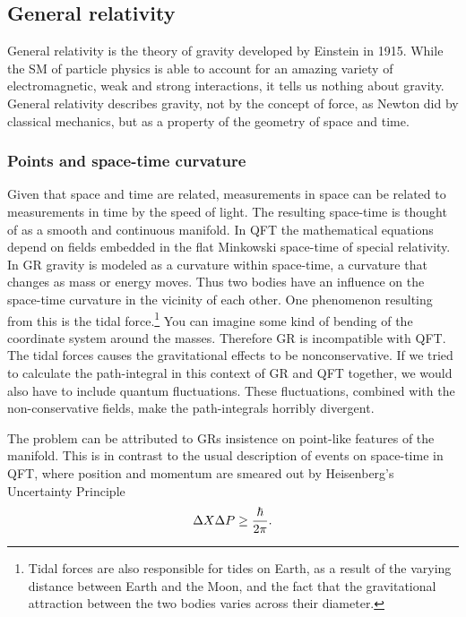 \subsection{General relativity}
General relativity is the theory of gravity developed by Einstein in 1915. While the SM of particle physics is able to account for an amazing variety of electromagnetic, weak and strong interactions, it tells us nothing about gravity. General relativity describes gravity, not by the concept of force, as Newton did by classical mechanics, but as a property of the geometry of space and time.

\subsubsection{Points and space-time curvature}
Given that space and time are related, measurements in space can be related to measurements in time by the speed of light. The resulting space-time is thought of as a smooth and continuous manifold. In QFT the mathematical equations depend on fields embedded in the flat Minkowski space-time of special relativity. In GR gravity is modeled as a curvature within space-time, a curvature that changes as mass or energy moves. Thus two bodies have an influence on the space-time curvature in the vicinity of each other. One phenomenon resulting from this is the tidal force.\footnote{Tidal forces are also responsible for tides on Earth, as a result of the varying distance between Earth and the Moon, and the fact that the gravitational attraction between the two bodies varies across their diameter.} You can imagine some kind of bending of the coordinate system around the masses. Therefore GR is incompatible with QFT. The tidal forces causes the gravitational effects to be nonconservative. If we tried to calculate the path-integral in this context of GR and QFT together, we would also have to include quantum fluctuations. These fluctuations, combined with the non-conservative fields, make the path-integrals horribly divergent.

The problem can be attributed to GRs insistence on point-like features of the manifold. This is in contrast to the usual description of events on space-time in QFT, where position and momentum are smeared out by Heisenberg's Uncertainty Principle
\begin{equation} \label{eq:heisenberg}
	\Delta X \Delta P \geq {\hbar \over 2 \pi}.
\end{equation}

